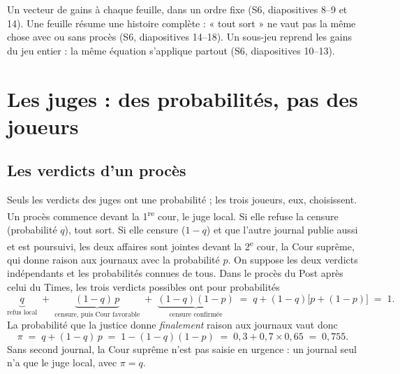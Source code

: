 \documentclass[11pt,a4paper]{article}
\theoremstyle{definition}
\begin{document}
\begin{cours}
Un vecteur de gains à chaque feuille, dans un ordre fixe (S6, diapositives 8--9 et 14). Une feuille résume une histoire complète : « tout sort » ne vaut pas la même chose avec ou sans procès (S6, diapositives 14--18). Un sous-jeu reprend les gains du jeu entier : la même équation s'applique partout (S6, diapositives 10--13).
\end{cours}

\section{Les juges : des probabilités, pas des joueurs}

\subsection{Les verdicts d'un procès}
Seuls les verdicts des juges ont une probabilité ; les trois joueurs, eux, choisissent. Un procès commence devant la 1\textsuperscript{re} cour, le juge local. Si elle refuse la censure (probabilité $q$), tout sort. Si elle censure ($1-q$) et que l'autre journal publie aussi et est poursuivi, les deux affaires sont jointes devant la 2\textsuperscript{e} cour, la Cour suprême, qui donne raison aux journaux avec la probabilité $p$. On suppose les deux verdicts indépendants et les probabilités connues de tous. Dans le procès du Post après celui du Times, les trois verdicts possibles ont pour probabilités
\[
\underbrace{q}_{\text{refus local}}\;+\;\underbrace{(1-q)\,p}_{\text{censure, puis Cour favorable}}\;+\;\underbrace{(1-q)(1-p)}_{\text{censure confirmée}}\;=\;q+(1-q)\big[p+(1-p)\big]\;=\;1 .
\]
La probabilité que la justice donne \emph{finalement} raison aux journaux vaut donc
\begin{equation}
\pi \;=\; q+(1-q)\,p \;=\; 1-(1-q)(1-p) \;=\; 0,3+0,7\times0,65 \;=\; 0,755. \label{eq:pi}
\end{equation}
Sans second journal, la Cour suprême n'est pas saisie en urgence : un journal seul n'a que le juge local, avec $\pi=q$.
\end{document}
